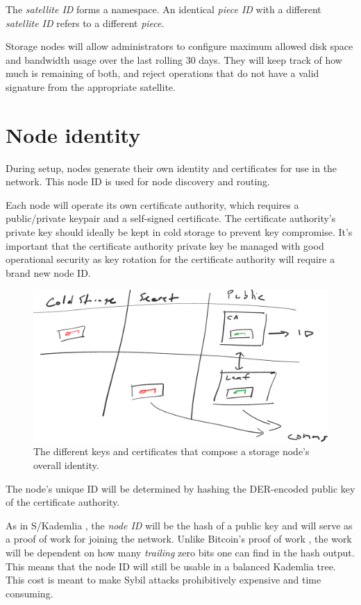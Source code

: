 \documentclass[11pt,fleqn,openany]{book}
\begin{document}
The {\em satellite ID} forms a namespace. An identical {\em piece ID} with a
different {\em satellite ID} refers to a different {\em piece}.

Storage nodes will allow administrators to configure maximum allowed disk
space and bandwidth usage over the last rolling 30 days.
They will keep track of how much is remaining of both, and reject operations
that do not have a valid signature from the appropriate satellite.

\section{Node identity}

During setup, nodes generate their own identity and certificates for use in
the network.
This node ID is used for node discovery and routing.

Each node will operate its own certificate authority, which requires a
public/private keypair and a self-signed certificate. The certificate
authority's private key should ideally be kept in cold storage to prevent key
compromise.
It's important that the certificate authority private key be managed with good
operational security as key rotation for the certificate authority will require
a brand new node ID.

\begin{figure}
\centering
\includegraphics[width=.8\textwidth]{diagram-drafts/identity.eps}
\caption{The different keys and certificates that compose a storage node's
overall identity.}
\end{figure}

The node's unique ID will be determined by hashing the DER-encoded public key
of the certificate authority.

As in S/Kademlia \cite{skad}, the {\em node ID} will be the hash of a public key
and will serve as a proof of work for joining the network. Unlike Bitcoin's
proof of work \cite{bitcoin}, the work will be dependent on how many
{\em trailing}
zero bits one can find in the hash output. This means that the node ID will
still be usable in a balanced Kademlia \cite{kad} tree.
This cost is meant to make Sybil attacks prohibitively expensive and time
consuming.
\end{document}

